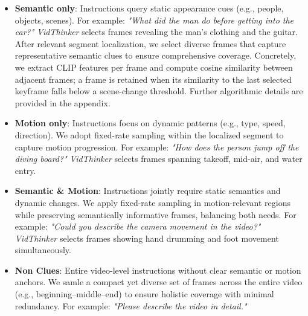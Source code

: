 \begin{itemize}[leftmargin=6mm, itemsep=2pt, parsep=0pt, topsep=2pt]
    \item \textbf{Semantic only}: Instructions query static appearance cues (e.g., people, objects, scenes). For example: \textit{"What did the man do before getting into the car?"} \textit{VidThinker} selects frames revealing the man's clothing and the guitar. After relevant segment localization, we select diverse frames that capture representative semantic clues to ensure comprehensive coverage. Concretely, we extract CLIP features per frame and compute cosine similarity between adjacent frames; a frame is retained when its similarity to the last selected keyframe falls below a scene-change threshold. Further algorithmic details are provided in the appendix.

    \item \textbf{Motion only}: Instructions focus on dynamic patterns (e.g., type, speed, direction). We adopt fixed-rate sampling within the localized segment to capture motion progression. For example: \textit{"How does the person jump off the diving board?"} \textit{VidThinker} selects frames spanning takeoff, mid-air, and water entry.
    
    \item \textbf{Semantic \& Motion}: Instructions jointly require static semantics and dynamic changes. We apply fixed-rate sampling in motion-relevant regions while preserving semantically informative frames, balancing both needs. For example: \textit{"Could you describe the camera movement in the video?"} \textit{VidThinker} selects frames showing hand drumming and foot movement simultaneously.
    
    \item \textbf{Non Clues}: Entire video-level instructions without clear semantic or motion anchors. We samle a compact yet diverse set of frames across the entire video (e.g., beginning–middle–end) to ensure holistic coverage with minimal redundancy. For example: \textit{"Please describe the video in detail."}
\end{itemize}

